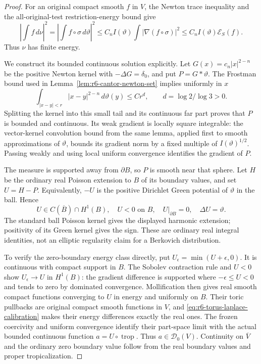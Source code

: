 \documentclass[11pt,a4paper]{article}
\numberwithin{equation}{section}
\theoremstyle{definition}
\theoremstyle{remark}
\begin{document}
\begin{proof}
For an original compact smooth $f$ in $V$, the Newton trace inequality
and the all-original-test restriction-energy bound give
\[
 \left|\int f\,d\nu\right|^2
    =\left|\int f\circ\sigma\,d\vartheta\right|^2
    \le C_n I(\vartheta)\int|\nabla(f\circ\sigma)|^2
    \le C_n I(\vartheta)\mathcal E_S(f).
\]
Thus $\nu$ has finite energy.

We construct its bounded continuous solution explicitly. Let
$G(x)=c_n|x|^{2-n}$ be the positive Newton kernel with
$-\Delta G=\delta_0$, and put $P=G*\vartheta$.
The Frostman bound used in
Lemma~\ref{lem:r6-cantor-newton-set} implies uniformly in $x$
\[
       \int_{|x-y|<r}|x-y|^{2-n}\,d\vartheta(y)\le C r^d,
                         \qquad d=\log2/\log3>0.
\]
Splitting the kernel into this small tail and its continuous far
part proves that $P$ is bounded and continuous. Its weak gradient
is locally square integrable: the vector-kernel convolution bound
from the same lemma, applied first to smooth approximations of
$\vartheta$, bounds its gradient norm by a fixed multiple of
$I(\vartheta)^{1/2}$. Passing weakly and using local uniform
convergence identifies the gradient of $P$.

The measure is supported away from $\partial B$, so $P$ is smooth
near that sphere. Let $H$ be the ordinary real Poisson extension to
$B$ of its boundary values, and set $U=H-P$. Equivalently,
$-U$ is the positive Dirichlet Green potential of $\vartheta$ in
the ball. Hence
\[
 U\in C(\overline B)\cap H^1(B),\quad U<0\text{ on }B,
            \quad U|_{\partial B}=0,\quad\Delta U=\vartheta.
\]
The standard ball Poisson kernel gives the displayed harmonic
extension; positivity of its Green kernel gives the sign. These are
ordinary real integral identities, not an elliptic regularity claim
for a Berkovich distribution.

To verify the zero-boundary energy class directly, put
$U_\epsilon=\min(U+\epsilon,0)$. It is continuous with compact
support in $B$. The Sobolev contraction rule and $U<0$ show
$U_\epsilon\to U$ in $H^1(B)$: the gradient difference is supported
where $-\epsilon\le U<0$ and tends to zero by dominated convergence.
Mollification then gives real smooth compact functions converging to
$U$ in energy and uniformly on $B$. Their toric pullbacks are
original compact smooth functions in $V$, and
\eqref{eq:r6-torus-laplace-calibration} makes their energy differences
exactly the real ones. The frozen coercivity and uniform convergence
identify their part-space limit with the actual bounded continuous
function $a=U\circ\operatorname{trop}$. Thus $a\in\mathscr D_0(V)$.
Continuity on $\overline V$ and the ordinary zero boundary value
follow from the real boundary values and proper tropicalization.


\end{proof}
\end{document}
